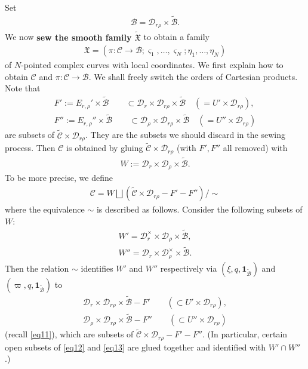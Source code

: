\documentclass[11pt,b5paper,notitlepage]{article}
\theoremstyle{definition}
\theoremstyle{plain}
\newcommand{\fk}{\mathfrak}
\newcommand{\mc}{\mathcal}
\newcommand{\wtd}{\widetilde}
\newcommand{\id}{\mathbf{1}}
\newcommand{\sgm}{\varsigma}
\numberwithin{equation}{section}
\begin{document}
Set
\begin{align}
\mc B=\mc D_{r\rho}\times\wtd{\mc B}.
\end{align}
We now \textbf{sew the smooth family $\wtd{\fk X}$} to obtain a family 
\begin{align*}
\fk X=(\pi:\mc C\rightarrow\mc B;\sgm_1,\dots,\sgm_N;\eta_1,\dots,\eta_N)
\end{align*}
of $N$-pointed  complex curves  with local coordinates. We first explain how to obtain $\mc C$ and $\pi:\mc C\rightarrow\mc B$. We shall freely switch the orders of Cartesian products. Note  that
\begin{gather*}
F':=E_{r,\rho}'\times\wtd{\mc B}\qquad\subset \mc D_{r}\times\mc D_{r\rho}\times\wtd{\mc B}\quad(= U'\times \mc D_{r\rho}),\\
F'':=E_{r,\rho}''\times\wtd{\mc B}\qquad\subset \mc D_{\rho}\times\mc D_{r\rho}\times\wtd{\mc B}\quad(= U''\times \mc D_{r\rho})
\end{gather*}
are subsets of $\wtd{\mc C}\times\mc D_{r\rho}$. They are the subsets  we should discard in the sewing process.  Then $\mc C$ is obtained by gluing $\wtd{\mc C}\times \mc D_{r\rho}$ (with $F',F''$ all removed)  with
\begin{align}
W:=\mc D_{r}\times\mc D_{\rho}\times\wtd{\mc B}.\label{eq10}
\end{align}
To be more precise, we define
\begin{align}
\mc C=W\bigsqcup(\wtd{\mc C}\times \mc D_{r\rho}-F'- F'')\Big/\sim \label{eq67}
\end{align}
where the equivalence $\sim$ is described as follows. Consider the following subsets of $W$:
\begin{gather}
W'=\mc D_{r}^\times\times\mc D_{\rho}\times\wtd{\mc B},\\
W''= \mc D_{r}\times\mc D_{\rho}^\times\times\wtd{\mc B}.
\end{gather}
Then the relation $\sim$ identifies $W'$ and $W''$  respectively via $(\xi,q,\id_{\wtd{\mc B}})$ and $(\varpi,q,\id_{\wtd{\mc B}})$  to
\begin{gather}
\mc D_{r}\times\mc D_{r\rho}\times\wtd{\mc B}-F'\qquad (\subset U'\times\mc D_{r\rho}),\label{eq12}\\
\mc D_{\rho}\times\mc D_{r\rho}\times\wtd{\mc B}-F''\qquad (\subset U''\times\mc D_{r\rho})\label{eq13}
\end{gather}
(recall \eqref{eq11}), which are subsets of $\wtd{\mc C}\times \mc D_{r\rho}-F'-F''$. (In particular, certain open subsets of \eqref{eq12} and \eqref{eq13} are glued together and identified with $W'\cap W''$.)
\end{document}
